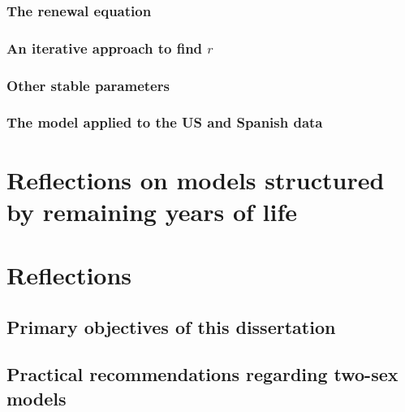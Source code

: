     \subsection{The renewal equation}
      
    \subsection{An iterative approach to find $r$}
      
    \subsection{Other stable parameters}
      
    \subsection{The model applied to the US and Spanish data}
      
   \chapter{Reflections on models structured by remaining years of life}
     
  
  \chapter{Reflections}
    
    \section{Primary objectives of this dissertation}
      
    \section{Practical recommendations regarding two-sex models}
      
